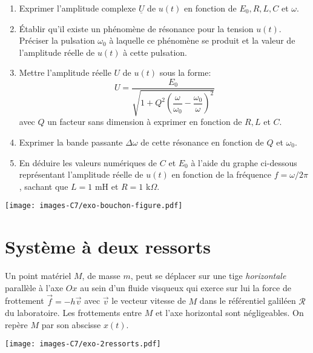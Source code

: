 \documentclass[
  10pt,
  a4paper,
  DIV=18]{scrartcl}
\begin{document}
\begin{enumerate}
\def\labelenumi{\arabic{enumi}.}
\item
  Exprimer l'amplitude complexe \(\underline{U}\) de \(u(t)\) en
  fonction de \(E_0,R,L,C\) et \(\omega\).
\item
  Établir qu'il existe un phénomène de résonance pour la tension
  \(u(t)\). Préciser la pulsation \(\omega_0\) à laquelle ce phénomène
  se produit et la valeur de l'amplitude réelle de \(u(t)\) à cette
  pulsation.
\item
  Mettre l'amplitude réelle \(U\) de \(u(t)\) sous la forme:
  \[U = \dfrac{E_0}{\sqrt{1 + Q^2\left(\dfrac{\omega}{\omega_0} - \dfrac{\omega_0}{\omega}\right)^2}}\]
  avec \(Q\) un facteur sans dimension à exprimer en fonction de \(R,L\)
  et \(C\).
\item
  Exprimer la bande passante \(\Delta\omega\) de cette résonance en
  fonction de \(Q\) et \(\omega_0\).
\item
  En déduire les valeurs numériques de \(C\) et \(E_0\) à l'aide du
  graphe ci-dessous représentant l'amplitude réelle de \(u(t)\) en
  fonction de la fréquence \(f=\omega/2\pi\), sachant que \(L=1\) mH et
  \(R=1\) k\(\Omega\).
\end{enumerate}

\begin{center}

\texttt{[image: images-C7/exo-bouchon-figure.pdf]}

\end{center}

\hypertarget{sec:2-ressorts}{%
\section{Système à deux ressorts}\label{sec:2-ressorts}}

\begin{multicols}{2}

Un point matériel \(M\), de masse \(m\), peut se déplacer sur une tige
\emph{horizontale} parallèle à l'axe \(Ox\) au sein d'un fluide visqueux
qui exerce sur lui la force de frottement \(\vec{f} = - h\vec{v}\) avec
\(\vec{v}\) le vecteur vitesse de \(M\) dans le référentiel galiléen
\(\mathcal{R}\) du laboratoire. Les frottements entre \(M\) et l'axe
horizontal sont négligeables. On repère \(M\) par son abscisse \(x(t)\).

\begin{center}

\texttt{[image: images-C7/exo-2ressorts.pdf]}

\end{center}

\end{multicols}
\end{document}
